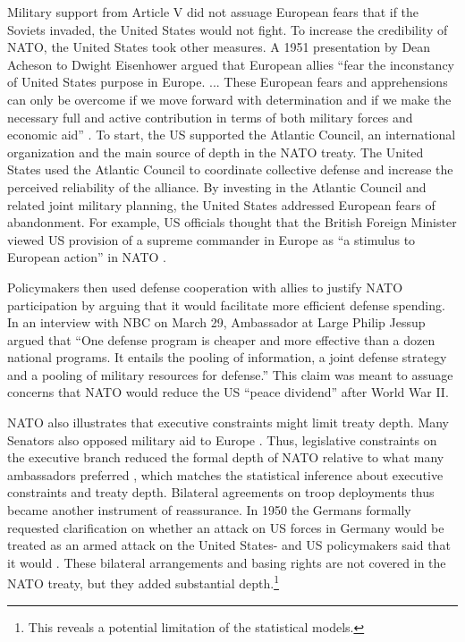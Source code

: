\documentclass[12pt]{article}
\begin{document}
Military support from Article V did not assuage European fears that if the Soviets invaded, the United States would not fight. 
To increase the credibility of NATO, the United States took other measures.  
A 1951 presentation by Dean Acheson to Dwight Eisenhower argued that European allies ``fear the inconstancy of United States purpose in Europe. ... These European fears and apprehensions can only be overcome if we move forward with determination and if we make the necessary full and active contribution in terms of both military forces and economic aid'' \citep[pg. 3]{Acheson1951}. 
To start, the US supported the Atlantic Council, an international organization and the main source of depth in the NATO treaty. 
The United States used the Atlantic Council to coordinate collective defense and increase the perceived reliability of the alliance. 
By investing in the Atlantic Council and related joint military planning, the United States addressed European fears of abandonment. 
For example, US officials thought that the British Foreign Minister viewed US provision of a supreme commander in Europe as ``a stimulus to European action'' in NATO \citep{Acheson1950}. 


Policymakers then used defense cooperation with allies to justify NATO participation by arguing that it would facilitate more efficient defense spending. 
In an interview with NBC on March 29, Ambassador at Large Philip Jessup argued that ``One defense program is cheaper and more effective than a dozen national programs. It entails the pooling of information, a joint defense strategy and a pooling of military resources for defense.''
This claim was meant to assuage concerns that NATO would reduce the US ``peace dividend'' after World War II. 


NATO also illustrates that executive constraints might limit treaty depth. 
Many Senators also opposed military aid to Europe \citep[pg 285]{Acheson1969}. 
Thus, legislative constraints on the executive branch reduced the formal depth of NATO relative to what many ambassadors preferred \citep[pg 277]{Acheson1969}, which matches the statistical inference about executive constraints and treaty depth.  
Bilateral agreements on troop deployments thus became another instrument of reassurance. 
In 1950 the Germans formally requested clarification on whether an attack on US forces in Germany would be treated as an armed attack on the United States- and US policymakers said that it would \citep[pg. 395]{Acheson1969}.  
These bilateral arrangements and basing rights are not covered in the NATO treaty, but they added substantial depth.\footnote{This reveals a potential limitation of the statistical models.}  
\end{document}
